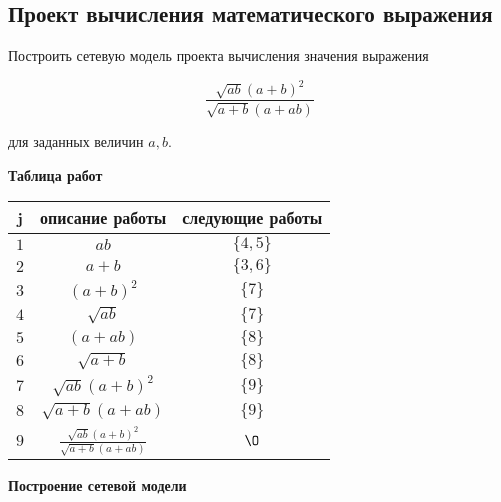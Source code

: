 \subsection{Проект вычисления математического выражения}\label{proj:math_expr_calc_project}


Построить сетевую модель проекта вычисления значения выражения

\[\boxed{\frac{\sqrt{ab}(a + b)^2}{\sqrt{a + b}(a + ab)}}\]

для заданных величин $a, b$.

\solution

\textbf{Таблица работ}

\begin{table}[H]
	\centering
	\begin{tabular}{ | c | c | c | } 
		\hline
		j & описание работы & следующие работы \\\hline
		$1$ & $ab$ & $\{4,5\}$ \\\hline
		$2$ & $a+b$ & $\{3, 6\}$ \\\hline
		$3$ & $(a+b)^2$ & $\{7\}$ \\\hline
		$4$ & $\sqrt{ab}$ & $\{7\}$ \\\hline
		$5$ & $(a+ab)$ & $\{8\}$ \\\hline
		$6$ & $\sqrt{a+b}$ & $\{8\}$ \\\hline
		$7$ & $\sqrt{ab}(a+b)^2$ & $\{9\}$ \\\hline
		$8$ & $\sqrt{a+b}(a+ab)$ & $\{9\}$ \\\hline
		$9$ & $\frac{\sqrt{ab}(a + b)^2}{\sqrt{a + b}(a + ab)}$ & $\O$ \\\hline
	\end{tabular}
\end{table}

\bigskip

\textbf{Построение сетевой модели}

